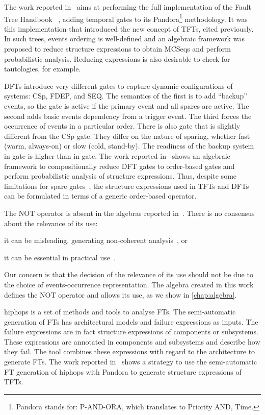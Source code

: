 \documentclass[12pt,openright,twoside,a4paper,oldfontcommands,english,brazil,final]{abntex2}
\theoremstyle{theo}
\def\FThandbook{Fault Tree Handbook~\cite{VGR+1981}\index{Fault Tree!Handbook}%
  \gdef\FThandbook{Fault Tree Handbook\index{Fault Tree!Handbook}\xspace}%
  \xspace}
\def\pandora{Pandora\footnote{Pandora stands for: P-AND-ORA, which translates to Priority AND, Time.}%
  \gdef\pandora{Pandora\xspace}%
  \xspace}
\begin{document}
The work reported in~\cite{WP2009} aims at performing the full implementation of the \FThandbook, adding temporal gates to its \pandora methodology.
It was this implementation that introduced the new concept of \acp{TFT}, cited previously.
In such trees, events ordering is well-defined and an algebraic framework was proposed to reduce structure expressions to obtain \acp{MCSeq} and perform probabilistic analysis.
Reducing expressions is also desirable to check for tautologies, for example.

\Acp{DFT} introduce very different gates to capture dynamic configurations of systems: \ac{CSp}, \ac{FDEP}, and \ac{SEQ}.
The semantics of the first is to add ``backup'' events, so the gate is active if the primary event and all spares are active.
The second adds basic events dependency from a trigger event.
The third forces the occurrence of events in a particular order.
There is also  gate that is slightly different from the \ac{CSp} gate.
They differ on the nature of sparing, whether fast (warm, always-on) or slow (cold, stand-by).
The readiness of the backup system in  gate is higher than in  gate.
The work reported in~\cite{MRL2011} shows an algebraic framework to compositionally reduce \ac{DFT} gates to order-based gates and perform probabilistic analysis of structure expressions. Thus, despite some limitations for spare gates~\cite{MRL2014}, the structure expressions used in \acp{TFT} and \acp{DFT} can be formulated in terms of a generic order-based operator.

\begin{sloppypar}
The \ac{NOT} operator is absent in the algebras reported in~\cite{WP2009,Walker2009,Merle2010,MRL2011b}.
There is no consensus about the relevance of its use:
\begin{alineasinline}
  \item it can be misleading, generating non-coherent analysis~\cite{Oliv2006}, or
  \item it can be essential in practical use~\cite{Andrews2001}.
\end{alineasinline}
Our concern is that the decision of the relevance of its use should not be due to the choice of events-occurrence representation.
The algebra created in this work defines the \ac{NOT} operator and allows its use, as we show in \cref{chap:algebra}.
\end{sloppypar}

\begin{sloppypar}
\Ac{hiphops} is a set of methods and tools to analyse \acp{FT}.
The semi-automatic generation of \acp{FT} has architectural models and failure expressions as inputs.
The failure expressions are in fact structure expressions of components or subsystems.
These expressions are annotated in components and subsystems and describe how they fail.
The tool combines these expressions with regard to the architecture to generate \acp{FT}.
The work reported in~\cite{WP2008} shows a strategy to use the semi-automatic \ac{FT} generation of \ac{hiphops} with \pandora to generate structure expressions of \acp{TFT}.
\end{sloppypar}
\end{document}
